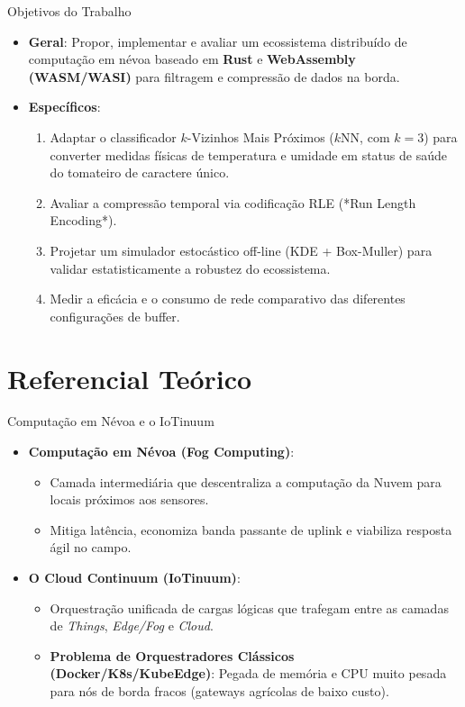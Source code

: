 \documentclass[aspectratio=169]{beamer}
\begin{document}
\begin{frame}{Objetivos do Trabalho}
  \begin{itemize}
    \item \textbf{Geral}: Propor, implementar e avaliar um ecossistema distribuído de computação em névoa baseado em \textbf{Rust} e \textbf{WebAssembly (WASM/WASI)} para filtragem e compressão de dados na borda.
    \vspace{0.2cm}
    \item \textbf{Específicos}:
      \begin{enumerate}
        \item Adaptar o classificador $k$-Vizinhos Mais Próximos ($k$NN, com $k=3$) para converter medidas físicas de temperatura e umidade em status de saúde do tomateiro de caractere único.
        \item Avaliar a compressão temporal via codificação RLE (*Run Length Encoding*).
        \item Projetar um simulador estocástico off-line (KDE + Box-Muller) para validar estatisticamente a robustez do ecossistema.
        \item Medir a eficácia e o consumo de rede comparativo das diferentes configurações de buffer.
      \end{enumerate}
  \end{itemize}
\end{frame}

\section{Referencial Teórico}

\begin{frame}{Computação em Névoa e o IoTinuum}
  \begin{itemize}
    \item \textbf{Computação em Névoa (Fog Computing)}:
      \begin{itemize}
        \item Camada intermediária que descentraliza a computação da Nuvem para locais próximos aos sensores.
        \item Mitiga latência, economiza banda passante de uplink e viabiliza resposta ágil no campo.
      \end{itemize}
    \vspace{0.3cm}
    \item \textbf{O Cloud Continuum (IoTinuum)}:
      \begin{itemize}
        \item Orquestração unificada de cargas lógicas que trafegam entre as camadas de \textit{Things}, \textit{Edge/Fog} e \textit{Cloud}.
        \item \textbf{Problema de Orquestradores Clássicos (Docker/K8s/KubeEdge)}: Pegada de memória e CPU muito pesada para nós de borda fracos (gateways agrícolas de baixo custo).
      \end{itemize}
  \end{itemize}
\end{frame}
\end{document}
